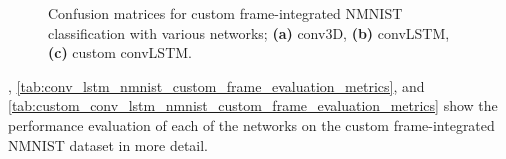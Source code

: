 \begin{figure}[htb]%
    \centering
    \qquad
    \qquad
    \caption{Confusion matrices for custom frame-integrated NMNIST classification with various networks; \textbf{(a)} conv3D, \textbf{(b)} convLSTM, \textbf{(c)} custom convLSTM.}%
    \label{fig:nmnist_custom_frame_c_matrices}%
\end{figure}

, \cref{tab:conv_lstm_nmnist_custom_frame_evaluation_metrics}, and \cref{tab:custom_conv_lstm_nmnist_custom_frame_evaluation_metrics} show the performance evaluation of each of the networks on the custom frame-integrated NMNIST dataset in more detail.

\vspace{10pt}

